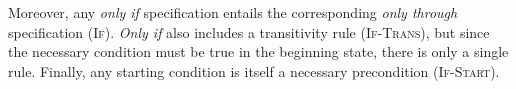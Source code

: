 Moreover, any \emph{only if} specification entails the corresponding
 \emph{only through} specification (\textsc{If}).
\emph{Only if} also includes a transitivity rule (\textsc{If-Trans}), but 
since the necessary condition must be true in the beginning state,
there is only a single rule. Finally, any starting condition is
itself a necessary precondition (\textsc{If-Start}). 



%

